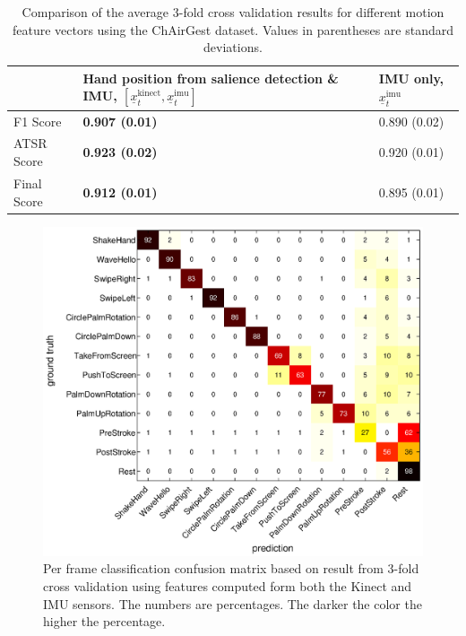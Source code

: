 \begin{table}[tbh]
\begin{center}
\begin{tabular}{|l|p{6cm}|p{4cm}|}
\hline
 & Hand position from salience detection \& IMU,
 $[\underline{x}^\text{kinect}_t, \underline{x}^\text{imu}_t]$ & IMU only, $\underline{x}^\text{imu}_t$ \\
\hline
F1 Score & \textbf{0.907 (0.01)} & 0.890 (0.02) \\
\hline
ATSR Score & \textbf{0.923 (0.02)}  & 0.920 (0.01) \\
\hline
Final Score & \textbf{0.912 (0.01)}  & 0.895 (0.01) \\
\hline
\end{tabular}
\caption{Comparison of the average 3-fold cross validation results for different
motion feature vectors using the ChAirGest dataset. Values in parentheses are
standard deviations.}
\label{tab:comp-motion-feature}
\end{center}
\end{table}

\begin{figure}[tbh]
\centering
\includegraphics[trim={6cm 3.5cm 10cm 1.5cm}, clip,
width=0.9\columnwidth]{figures/confusion-matrix.eps} \caption{Per frame
classification confusion matrix based on result from 3-fold cross validation
using features computed form both the Kinect and IMU sensors. The numbers are
percentages.
The darker the color the higher the percentage.}
\label{fig:confusion}
\end{figure}

